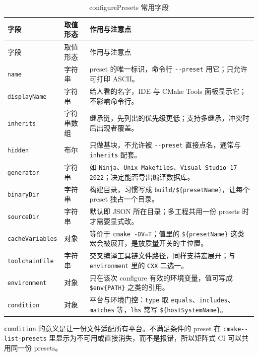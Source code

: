 \documentclass[12pt,a4paper,fontset=fandol]{ctexbook}
\newcommand{\Opt}[1]{\texttt{-\/-#1}}
\newcommand{\Bk}{\discretionary{}{}{}}
\begin{document}
{\footnotesize
\begin{longtable}{@{}>{\raggedright\arraybackslash}p{}
                  >{\raggedright\arraybackslash}p{}
                  >{\raggedright\arraybackslash}p{}@{}}
\caption{configurePresets 常用字段}\label{tab:ch16-conf}\\
\toprule
字段 & 取值形态 & 作用与注意点 \\
\midrule
\endfirsthead
\toprule
字段 & 取值形态 & 作用与注意点 \\
\midrule
\endhead
\bottomrule
\endlastfoot
\texttt{name} & 字符串 & preset 的唯一标识，命令行 \Opt{preset} 用它；只允许可打印 ASCII。 \\
\texttt{displayName} & 字符串 & 给人看的名字，IDE 与 CMake Tools 面板显示它；不影响命令行。 \\
\texttt{inherits} & 字符串数组 & 继承链，先列出的优先级更低；支持多继承，冲突时后出现者覆盖。 \\
\texttt{hidden} & 布尔 & 只做基块，不允许被 \Opt{preset} 直接点名，通常与 \texttt{inherits} 配套。 \\
\texttt{generator} & 字符串 & 如 \texttt{Ninja}、\texttt{Unix Makefiles}、\texttt{Visual Studio 17 2022}；决定能否导出编译数据库。 \\
\texttt{binaryDir} & 字符串 & 构建目录，习惯写成 \texttt{build/}\-\allowbreak\texttt{\$\{presetName\}}，让每个 preset 独占一个目录。 \\
\texttt{sourceDir} & 字符串 & 默认即 JSON 所在目录；多工程共用一份 presets 时才需要显式改。 \\
\texttt{cacheVariables} & 对象 & 等价于 \texttt{cmake -DV=T}；值里的 \texttt{\$\{presetName\}} 这类宏会被展开，是放质量开关的主位置。 \\
\texttt{toolchainFile} & 字符串 & 交叉编译工具链文件路径，同样支持宏展开；与 \texttt{environment} 里的 \texttt{CXX} 二选一。 \\
\texttt{environment} & 对象 & 只在该次 configure 有效的环境变量，值可写成 \texttt{\$env\{PATH\}} 之类的引用。 \\
\texttt{condition} & 对象 & 平台与环境门控：\texttt{type} 取 \texttt{equals}、\texttt{includes}、\texttt{matches} 等，\texttt{lhs} 常写 \texttt{\$\{hostSystem\allowbreak Name\}}。 \\
\end{longtable}
}

\texttt{condition} 的意义是让一份文件适配所有平台。不满足条件的 preset 在 \texttt{cmake}\Opt{list-{\Bk}presets} 里显示为不可用或直接消失，而不是报错，所以矩阵式 CI 可以共用同一份 presets。
\end{document}
